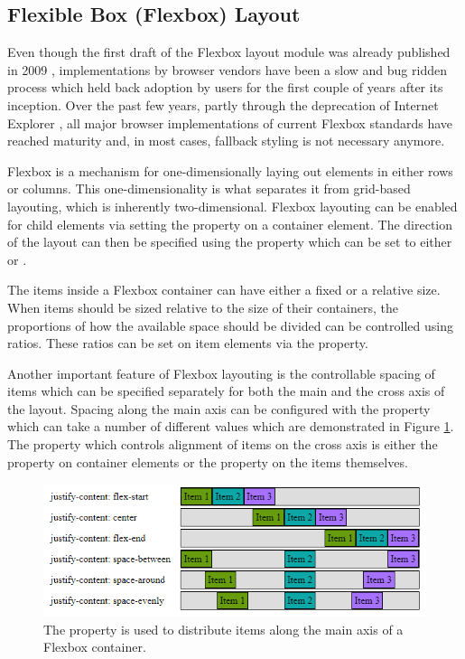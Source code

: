 \subsection{Flexible Box (Flexbox) Layout }
\label{sec:Flexbox}

Even though the first draft of the Flexbox layout module was already published in 2009 \parencite{CSSFlexboxFirstDraft}, implementations by browser vendors have been a slow and bug ridden process \parencite{CanIUseCSSFlexbox} which held back adoption by users for the first couple of years after its inception. 
Over the past few years, partly through the deprecation of Internet Explorer \parencite{IEDeprecation}, all major browser implementations of current Flexbox standards \parencite{CSSFlexbox} have reached maturity and, in most cases, fallback styling is not necessary anymore.

Flexbox is a mechanism for one-dimensionally laying out elements in either rows or columns. 
This one-dimensionality is what separates it from grid-based layouting, which is inherently two-dimensional. 
Flexbox layouting can be enabled for child elements via setting the  property on a container element. 
The direction of the layout can then be specified using the  property which can be set to either  or .

The items inside a Flexbox container can have either a fixed or a relative size. 
When items should be sized relative to the size of their containers, the proportions of how the available space should be divided can be controlled using ratios. 
These ratios can be set on item elements via the  property.

Another important feature of Flexbox layouting is the controllable spacing of items which can be specified separately for both the main and the cross axis of the layout. 
Spacing along the main axis can be configured with the  property which can take a number of different values which are demonstrated in Figure \ref{fig:FlexboxJustifyContent}. 
The property which controls alignment of items on the cross axis is either the  property on container elements or the  property on the items themselves.

\begin{figure}[tp]
\centering
\includegraphics[keepaspectratio,width=\linewidth,height=\fullh / 3]{images/flexbox-justify-content.png}
\caption[Flexbox Justify Content Property]{
  The  property is used to distribute items along the main axis of a Flexbox container. 
}
\label{fig:FlexboxJustifyContent}
\end{figure}

